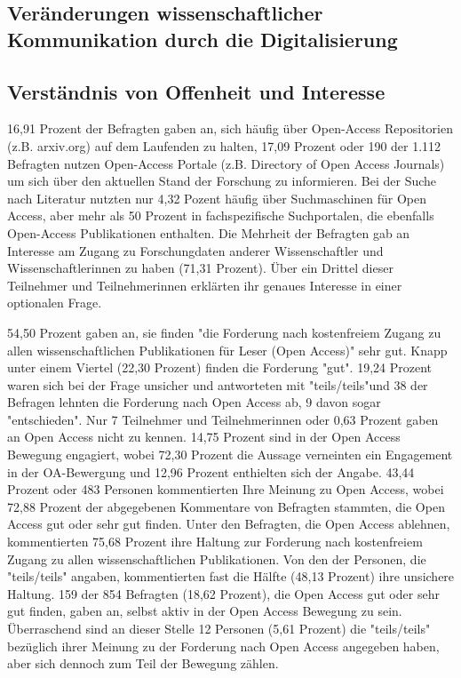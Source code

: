 \subsection{Veränderungen wissenschaftlicher Kommunikation durch die Digitalisierung}

\subsection{Verständnis von Offenheit und Interesse}

16,91 Prozent der Befragten gaben an, sich häufig über Open-Access Repositorien (z.B. arxiv.org) auf dem Laufenden zu halten, 17,09 Prozent oder 190 der 1.112 Befragten nutzen Open-Access Portale (z.B. Directory of Open Access Journals) um sich über den aktuellen Stand der Forschung zu informieren. Bei der Suche nach Literatur nutzten nur 4,32 Pozent häufig über Suchmaschinen für Open Access, aber mehr als 50 Prozent in fachspezifische Suchportalen, die ebenfalls Open-Access Publikationen enthalten. Die Mehrheit der Befragten gab an Interesse am Zugang zu Forschungdaten anderer Wissenschaftler und Wissenschaftlerinnen zu haben (71,31 Prozent). Über ein Drittel dieser Teilnehmer und Teilnehmerinnen erklärten ihr genaues Interesse in einer optionalen Frage.

54,50 Prozent gaben an, sie finden "die Forderung nach kostenfreiem Zugang zu allen wissenschaftlichen Publikationen für Leser (Open Access)" sehr gut. Knapp unter einem Viertel (22,30 Prozent) finden die Forderung "gut". 19,24 Prozent waren sich bei der Frage unsicher und antworteten mit "teils/teils"und 38 der Befragen lehnten die Forderung nach Open Access ab, 9 davon sogar "entschieden". Nur 7 Teilnehmer und Teilnehmerinnen oder 0,63 Prozent gaben an Open Access nicht zu kennen. 14,75 Prozent sind in der Open Access Bewegung engagiert, wobei 72,30 Prozent die Aussage verneinten ein Engagement in der OA-Bewergung und 12,96 Prozent enthielten sich der Angabe. 43,44 Prozent oder 483 Personen kommentierten Ihre Meinung zu Open Access, wobei 72,88 Prozent der abgegebenen Kommentare von Befragten stammten, die Open Access gut oder sehr gut finden. Unter den Befragten, die Open Access ablehnen, kommentierten 75,68 Prozent ihre Haltung zur Forderung nach kostenfreiem Zugang zu allen wissenschaftlichen Publikationen. Von den der Personen, die "teils/teils" angaben, kommentierten fast die Hälfte (48,13 Prozent) ihre unsichere Haltung. 159 der 854 Befragten (18,62 Prozent), die Open Access gut oder sehr gut finden, gaben an, selbst aktiv in der Open Access Bewegung zu sein. Überraschend sind an dieser Stelle 12 Personen (5,61 Prozent) die "teils/teils" bezüglich ihrer Meinung zu der Forderung nach Open Access angegeben haben, aber sich dennoch zum Teil der Bewegung zählen.

